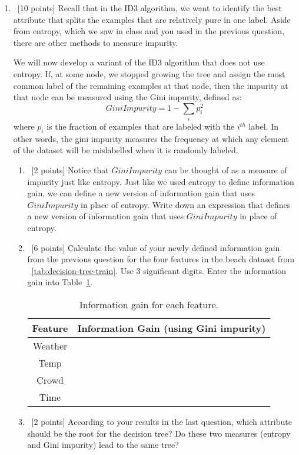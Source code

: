 \begin{enumerate}
\begin{enumerate}
  \end{enumerate}



\item~[10 points] Recall that in the ID3 algorithm, we want to identify the best attribute that splits the examples that are relatively pure in one label.
  Aside from entropy, which we saw in class and you used in the previous question, there are other methods to measure impurity.

  We will now develop a variant of the ID3 algorithm that does not use entropy. If, at some node, we stopped growing the tree and assign the most common label of the remaining examples at that node, then the impurity at that node can be measured using the Gini impurity, defined as:
  $$GiniImpurity = 1 - \sum_{i}p_i^2$$
  where $p_i$ is the fraction of examples that are labeled with the $i^{th}$ label. In other words, the gini impurity measures the frequency at which any element of the dataset will be mislabelled when it is randomly labeled.



  \begin{enumerate}
  \item~[2 points]   Notice that $GiniImpurity$ can be thought of as a measure of impurity just like entropy. Just like we used entropy to define information gain, we can define a new version of information gain that uses $GiniImpurity$ in place of entropy. Write down an expression that defines a new version of information gain that uses $GiniImpurity$ in place of entropy.

  \item~[6 points] Calculate the value of your newly defined information gain from the previous question for the four features in the beach dataset from ~\ref{tab:decision-tree-train}. Use 3 significant digits. Enter the information gain into Table~\ref{tab:gini-ig}.

    \begin{table}[h!]
      \centering
      \begin{tabular}{c|c}
        \hline
        Feature & Information Gain (using Gini impurity) \\ \hline
        Weather &                  \\
        Temp    &                  \\
        Crowd   &                  \\
        Time    &                  \\ \hline
      \end{tabular}
      \caption{Information gain for each feature.}\label{tab:gini-ig}
    \end{table}

  \item~[2 points] According to your results in the last question, which
    attribute should be the root for the decision tree?  Do these two measures
    (entropy and Gini impurity) lead to the same tree?
  \end{enumerate}

\end{enumerate}




